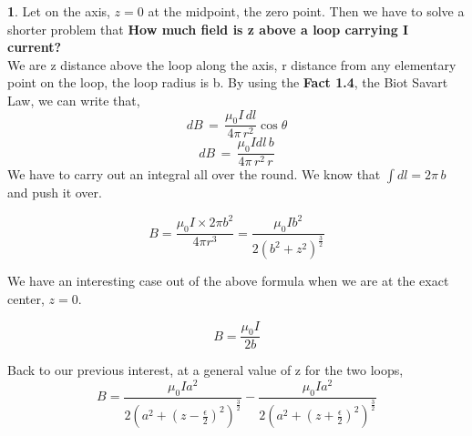 \documentclass[10pt,letterpaper,twocolumn]{article}
\theoremstyle{definition}
\theoremstyle{definition}
\theoremstyle{definition}
\newtheorem{sol}{\framebox[0.07\textwidth]{Sol}}[section]
\begin{document}
\begin{sol}
Let on the axis, $z=0$ at the midpoint, the zero point. Then we have to solve a shorter problem that \textbf{How much field is z above a loop carrying I current?}\\
We are z distance above the loop along the axis, r distance from any elementary point on the loop, the loop radius is b. By using the \textbf{Fact 1.4}, the Biot Savart Law, we can write that,
\[ dB \, = \, \frac{\mu_0 I \, dl}{4\pi \, r^2} \cos\theta \]
\[ dB \,= \, \frac{\mu_0 I dl \, b}{4\pi \, r^2 \, r}\]
We have to carry out an integral all over the  round. We know that $ \int dl = 2\pi \, b$ and push it over.

\[B = \frac{\mu_0 I \times 2\pi b^2}{4\pi r^3} = \frac{\mu_0 I b^2}{2(b^2 + z^2)^ {\frac{3}{2}}}\]

We have an interesting case out of the above formula when we are at the exact center, $z=0$.

\[B = \frac{\mu_0 I}{2b}\]

Back to our previous interest, at a general value of z for the two loops, 
\[ B= \frac{ \mu_0 I a^2} {2 ( a^2 + (z - \frac{\epsilon}{2})^2 )^{\frac{3}{2} }} - \frac{ \mu_0 I a^2}{2 ( a^2 + (z + \frac{\epsilon}{2})^2 )^{\frac{3}{2}}}  \]


\end{sol}
\end{document}
